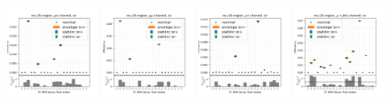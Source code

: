 \begin{figure}
    \includegraphics[width=0.24\textwidth]{appendices/ttSystReweighting/figures/afterCorr/icata1_ch0_isr.png}
    \includegraphics[width=0.24\textwidth]{appendices/ttSystReweighting/figures/afterCorr/icata1_ch1_isr.png}
    \includegraphics[width=0.24\textwidth]{appendices/ttSystReweighting/figures/afterCorr/icata1_ch2_isr.png}
    \includegraphics[width=0.24\textwidth]{appendices/ttSystReweighting/figures/afterCorr/icata1_ch3_isr.png}
    

\end{figure}

